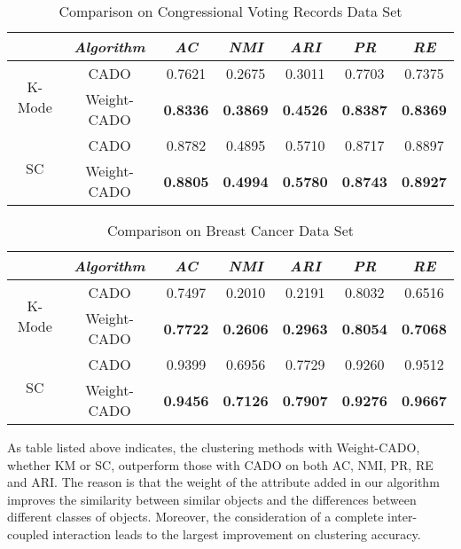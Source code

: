 \documentclass[review]{elsarticle}
\begin{document}
\begin{table}[!h]\tabcolsep=0.065in
\centering
\caption{Comparison on Congressional Voting Records Data Set}
\small
\label{tab:Comparison on Congressional Voting Records Data Set}
\begin{tabular}{c|c|c|c|c|c|c}
\hline
\emph{}&\emph{Algorithm}&\emph{AC}&\emph{NMI}&\emph{ARI}&\emph{PR}&\emph{RE} \\
\hline
\multirow{2}{*}{K-Mode} & CADO & 0.7621 & 0.2675 & 0.3011 & 0.7703 & 0.7375\\
    \cline{2-7}
    & Weight-CADO & \textbf{0.8336} & \textbf{0.3869} & \textbf{0.4526} & \textbf{0.8387} & \textbf{0.8369}\\
    \hline
\multirow{2}{*}{SC} & CADO & 0.8782 & 0.4895 & 0.5710 & 0.8717 & 0.8897\\
    \cline{2-7}
    & Weight-CADO & \textbf{0.8805} & \textbf{0.4994} & \textbf{0.5780} & \textbf{0.8743} & \textbf{0.8927}\\
\hline
\end{tabular}
\end{table}

\begin{table}[!h]\tabcolsep=0.065in
\centering
\caption{Comparison on Breast Cancer Data Set}
\small
\label{tab:Comparison on Breast Cancer Data Set}
\begin{tabular}{c|c|c|c|c|c|c}
\hline
\emph{}&\emph{Algorithm}&\emph{AC}&\emph{NMI}&\emph{ARI}&\emph{PR}&\emph{RE} \\
\hline
\multirow{2}{*}{K-Mode} & CADO & 0.7497 & 0.2010 & 0.2191 & 0.8032 & 0.6516\\
    \cline{2-7}
    & Weight-CADO & \textbf{0.7722} & \textbf{0.2606} & \textbf{0.2963} & \textbf{0.8054} & \textbf{0.7068}\\
    \hline
\multirow{2}{*}{SC} & CADO & 0.9399 & 0.6956 & 0.7729 & 0.9260 & 0.9512\\
    \cline{2-7}
    & Weight-CADO & \textbf{0.9456} & \textbf{0.7126} & \textbf{0.7907} & \textbf{0.9276} & \textbf{0.9667}\\
\hline
\end{tabular}
\end{table}


 As table listed above indicates, the clustering methods with Weight-CADO, whether KM or SC, outperform those with CADO on both AC, NMI, PR, RE and ARI. The reason is that the weight of the attribute added in our algorithm improves the similarity between similar objects and the differences between different classes of objects. Moreover, the consideration of a complete inter-coupled interaction leads to the largest improvement on clustering accuracy.
\end{document}
